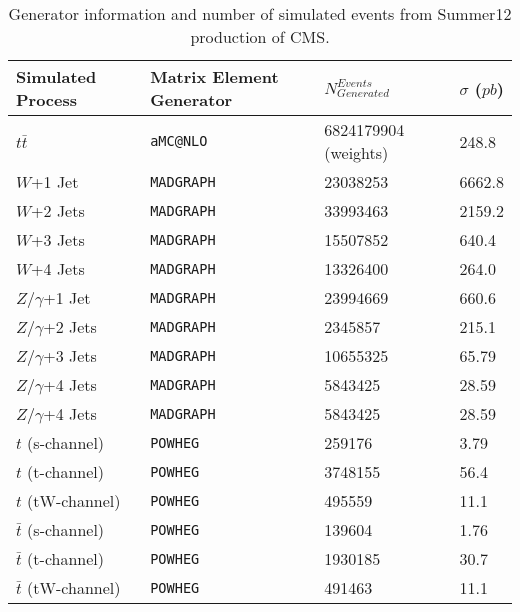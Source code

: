 \documentclass{cmspaperpdf}
\begin{document}
\begin{table}[h!]
\small
\centering
\begin{tabular}{| p{2.55 cm} | p{4 cm} | p{2 cm} | p{2 cm} |}
\hline
\textbf{Simulated Process} & \textbf{Matrix Element Generator} & $\displaystyle{N^{Events}_{Generated}}$ & \textbf{ $\sigma$ ($\displaystyle{pb}$)}\\[0.5ex]
\hline
$\displaystyle{t\bar{t}}$               & \texttt{aMC@NLO}               					 & 6824179904 (weights) & 248.8			\\
$\displaystyle{W}$+1 Jet                & \texttt{MADGRAPH}              & 23038253 & 6662.8 \\
$\displaystyle{W}$+2 Jets               & \texttt{MADGRAPH}              & 33993463 & 2159.2 \\
$\displaystyle{W}$+3 Jets               & \texttt{MADGRAPH}              & 15507852 & 640.4  \\
$\displaystyle{W}$+4 Jets               & \texttt{MADGRAPH}              & 13326400 & 264.0  \\
$\displaystyle{Z/\gamma}$+1 Jet         & \texttt{MADGRAPH}         	   & 23994669 & 660.6  \\
$\displaystyle{Z/\gamma}$+2 Jets        & \texttt{MADGRAPH}         & 2345857 & 215.1  \\
$\displaystyle{Z/\gamma}$+3 Jets        & \texttt{MADGRAPH}          & 10655325 & 65.79  \\
$\displaystyle{Z/\gamma}$+4 Jets        & \texttt{MADGRAPH}          & 5843425 & 28.59  \\
$\displaystyle{Z/\gamma}$+4 Jets        & \texttt{MADGRAPH}          & 5843425 & 28.59  \\
$\displaystyle{t}$ (s-channel)          & \texttt{POWHEG}        & 259176 & 3.79   \\
$\displaystyle{t}$ (t-channel)          & \texttt{POWHEG}       & 3748155 & 56.4   \\
$\displaystyle{t}$ (tW-channel)         & \texttt{POWHEG}      & 495559 & 11.1   \\
$\displaystyle{\bar{t}}$ (s-channel)    & \texttt{POWHEG}     & 139604 & 1.76   \\
$\displaystyle{\bar{t}}$ (t-channel)    & \texttt{POWHEG}     & 1930185 & 30.7   \\
$\displaystyle{\bar{t}}$ (tW-channel)   & \texttt{POWHEG} & 491463 & 11.1   \\
\hline
\end{tabular}
\caption{\small Generator information and number of simulated events from Summer12 production of CMS.}

\label{tab:sim_samples2}
\end{table}
\end{document}
